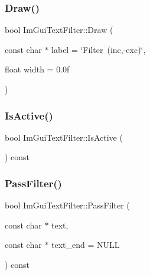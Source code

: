 \mbox{\label{structImGuiTextFilter_ab93ad5985019ff9d3781606551fc26cc}} 
\subsubsection{\texorpdfstring{Draw()}{Draw()}}
{\footnotesize\ttfamily bool Im\+Gui\+Text\+Filter\+::\+Draw (\begin{DoxyParamCaption}\item[{const char $\ast$}]{label = {\ttfamily \char`\"{}Filter~(inc,-\/exc)\char`\"{}},  }\item[{float}]{width = {\ttfamily 0.0f} }\end{DoxyParamCaption})}

\mbox{\label{structImGuiTextFilter_a493158f2ab8f45fcf303c3f953be9b88}} 
\subsubsection{\texorpdfstring{Is\+Active()}{IsActive()}}
{\footnotesize\ttfamily bool Im\+Gui\+Text\+Filter\+::\+Is\+Active (\begin{DoxyParamCaption}{ }\end{DoxyParamCaption}) const\hspace{0.3cm}{\ttfamily [inline]}}

\mbox{\label{structImGuiTextFilter_a88d73ff8b81fbbd0a129b1bf3498d8aa}} 
\subsubsection{\texorpdfstring{Pass\+Filter()}{PassFilter()}}
{\footnotesize\ttfamily bool Im\+Gui\+Text\+Filter\+::\+Pass\+Filter (\begin{DoxyParamCaption}\item[{const char $\ast$}]{text,  }\item[{const char $\ast$}]{text\+\_\+end = {\ttfamily NULL} }\end{DoxyParamCaption}) const}




